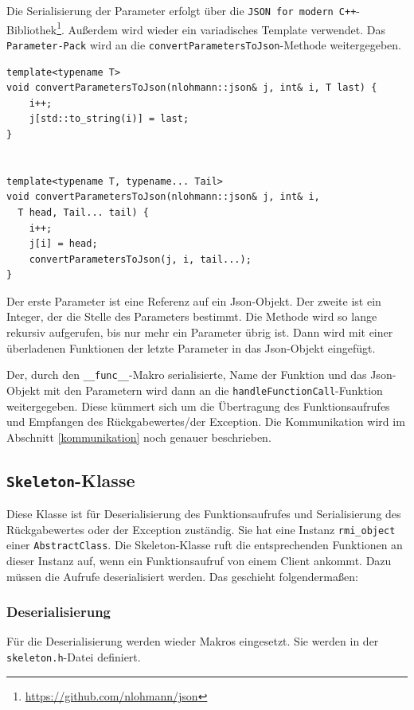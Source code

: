 \documentclass[a4paper,oneside,10pt]{report}
\begin{document}
Die Serialisierung der Parameter erfolgt über die \texttt{JSON for modern C++}-Bibliothek\footnote{\url{https://github.com/nlohmann/json}}. Außerdem wird wieder ein variadisches Template verwendet. Das \texttt{Parameter-Pack} wird an die \texttt{convertParametersToJson}-Methode weitergegeben. 

\begin{lstlisting}
template<typename T>
void convertParametersToJson(nlohmann::json& j, int& i, T last) {
    i++;
    j[std::to_string(i)] = last;
}


template<typename T, typename... Tail>
void convertParametersToJson(nlohmann::json& j, int& i, 
  T head, Tail... tail) {
    i++;
    j[i] = head;
    convertParametersToJson(j, i, tail...);
}
\end{lstlisting}

Der erste Parameter ist eine Referenz auf ein Json-Objekt. Der zweite ist ein Integer, der die Stelle des Parameters bestimmt. Die Methode wird so lange rekursiv aufgerufen, bis nur mehr ein Parameter übrig ist. Dann wird mit einer überladenen Funktionen der letzte Parameter in das Json-Objekt eingefügt. 

Der, durch den \texttt{\_\_func\_\_}-Makro serialisierte, Name der Funktion und das Json-Objekt mit den Parametern wird dann an die \texttt{handleFunctionCall}-Funktion weitergegeben. Diese kümmert sich um die Übertragung des Funktionsaufrufes und Empfangen des Rückgabewertes/der Exception. Die Kommunikation wird im Abschnitt \ref{kommunikation} noch genauer beschrieben. 

\subsection{\texttt{Skeleton}-Klasse}

Diese Klasse ist für Deserialisierung des Funktionsaufrufes und Serialisierung des Rückgabewertes oder der Exception zuständig. Sie hat eine Instanz \texttt{rmi\_object} einer \texttt{AbstractClass}. Die Skeleton-Klasse ruft die entsprechenden Funktionen an dieser Instanz auf, wenn ein Funktionsaufruf von einem Client ankommt. Dazu müssen die Aufrufe deserialisiert werden. Das geschieht folgendermaßen:  

\subsubsection{Deserialisierung}

Für die Deserialisierung werden wieder Makros eingesetzt. Sie werden in der \texttt{skeleton.h}-Datei definiert. 
\end{document}
